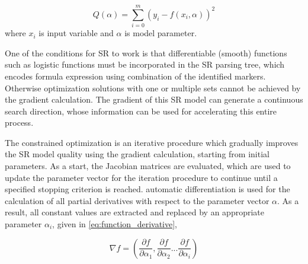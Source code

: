 \documentclass[final,5p,times,twocolumn]{elsarticle}
\begin{document}
\begin{equation} \label{eq:optimization_function}
Q(\alpha) = \sum_{i=0}^{m}(y_i-f(x_i,\alpha))^2
\end{equation}
where $x_i$ is input variable and $\alpha$ is model parameter.


One of the conditions for SR to work is that differentiable (smooth) functions such as logistic functions must be incorporated in the SR parsing tree, which encodes formula expression using combination of the identified markers. Otherwise optimization solutions with one or multiple sets cannot be achieved by the gradient calculation. The gradient of this SR model can generate a continuous search direction, whose information can be used for accelerating this entire process.

The constrained optimization is an iterative procedure which gradually improves the SR model quality using the gradient calculation, starting from initial parameters. As a start, the Jacobian matrices are evaluated, which are used to update the parameter vector for the iteration procedure to continue until a specified stopping criterion is reached. automatic differentiation is used for the calculation of all partial derivatives with respect to the parameter vector $\alpha$. As a result, all constant values are extracted and replaced by an appropriate parameter $\alpha_i$, given in \autoref{eq:function_derivative},

\begin{equation} \label{eq:function_derivative}
\nabla f = \left( \frac{\partial f}{\partial \alpha_1},
\frac{\partial f}{\partial \alpha_2}...
\frac{\partial f}{\partial \alpha_i}\right)
\end{equation}



\end{document}
